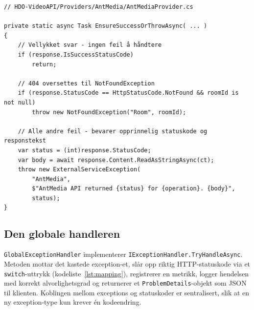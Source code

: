 \begin{lstlisting}[language={[Sharp]C}, caption={Kasting av domenespesifik exception i \texttt{AntMediaProvider}.}, label={lst:notfound-throw}]
// HDO-VideoAPI/Providers/AntMedia/AntMediaProvider.cs

private static async Task EnsureSuccessOrThrowAsync( ... )
{
    // Vellykket svar - ingen feil å håndtere
    if (response.IsSuccessStatusCode)
        return;

    // 404 oversettes til NotFoundException
    if (response.StatusCode == HttpStatusCode.NotFound && roomId is not null)
        throw new NotFoundException("Room", roomId);

    // Alle andre feil - bevarer opprinnelig statuskode og responstekst
    var status = (int)response.StatusCode;
    var body = await response.Content.ReadAsStringAsync(ct);
    throw new ExternalServiceException(
        "AntMedia",
        $"AntMedia API returned {status} for {operation}. {body}",
        status);
}
\end{lstlisting}

\subsection{Den globale handleren}
\label{subsec:errors-handler}


\texttt{GlobalExceptionHandler} implementerer \texttt{IExceptionHandler.TryHandleAsync}. Metoden mottar det kastede exception-et, slår opp riktig HTTP-statuskode via et \texttt{switch}-uttrykk (kodeliste~\ref{lst:mapping}), registrerer en metrikk, logger hendelsen med korrekt alvorlighetsgrad og returnerer et \texttt{ProblemDetails}-objekt som JSON til klienten. Koblingen mellom exceptions og statuskoder er sentralisert, slik at en ny exception-type kun krever én kodeendring.

